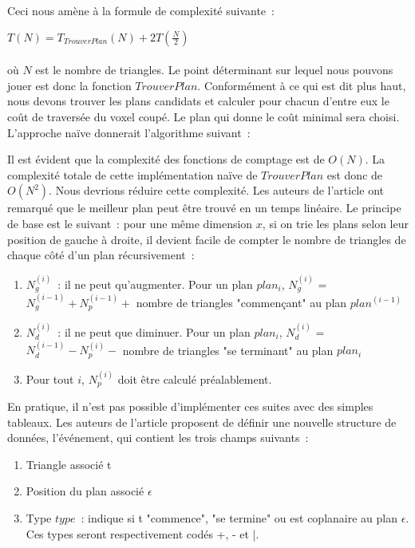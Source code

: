 \documentclass[a4paper]{article}
\begin{document}
Ceci nous amène à la formule de complexité suivante~:

$T(N) = T_{TrouverPlan}(N) + 2T(\frac{N}{2})$
\\\\
où $N$ est le nombre de triangles. Le point déterminant sur lequel nous pouvons jouer est donc la fonction $TrouverPlan$. Conformément à ce qui est dit plus haut, nous devons trouver les plans candidats et calculer pour chacun d'entre eux le coût de traversée du voxel coupé. Le plan qui donne le coût minimal sera choisi. L'approche naïve donnerait l'algorithme suivant~:

\begin{algorithm}
\end{algorithm}

Il est évident que la complexité des fonctions de comptage est de $O(N)$. La complexité totale de cette implémentation naïve de $TrouverPlan$ est donc de $O(N^2)$. Nous devrions réduire cette complexité. Les auteurs de l'article ont remarqué que le meilleur plan peut être trouvé en un temps linéaire. Le principe de base est le suivant~: pour une même dimension $x$, si on trie les plans selon leur position de gauche à droite, il devient facile de compter le nombre de triangles de chaque côté d'un plan récursivement~:
\begin{enumerate}
	\item $N_g^{(i)}$~: il ne peut qu'augmenter. Pour un plan $plan_i$, $N_g^{(i)}$ = $N_g^{(i-1)} + N_p^{(i-1)} + $ nombre de triangles "commençant" au plan $plan^{(i-1)}$
	\item $N_d^{(i)}$~: il ne peut que diminuer. Pour un plan $plan_i$, $N_d^{(i)}$ = $N_d^{(i-1)} - N_p^{(i)} - $ nombre de triangles "se terminant" au plan $plan_i$ 
	\item Pour tout $i$, $N_p^(i)$ doit \^etre calculé préalablement.
\end{enumerate}

En pratique, il n'est pas possible d'implémenter ces suites avec des simples tableaux. Les auteurs de l'article proposent de définir une nouvelle structure de données, l'événement, qui contient les trois champs suivants~:
\begin{enumerate}
	\item Triangle associé t
	\item Position du plan associé $\epsilon$
	\item Type $type$~: indique si t "commence", "se termine" ou est coplanaire au plan $\epsilon$. Ces types seront respectivement codés +, - et |.
\end{enumerate}
\end{document}
